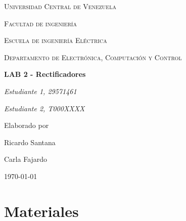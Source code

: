 \documentclass[letterpaper, 12pt]{report}
\begin{document}

\begin{titlepage}
	\centering
	{\scshape\Large Universidad Central de Venezuela \par}
    {\scshape\Large Facultad de ingenier\'ia \par}
    {\scshape\Large Escuela de ingenier\'ia El\'ectrica \par}
    {\scshape\Large Departamento de Electr\'onica, Computaci\'on y Control \par}
    \vspace{4cm}
	{\Large\bfseries LAB 2 - Rectificadores\par}
	\vspace{4cm}
	{\itshape Estudiante 1, 29571461 \par}
    {\itshape Estudiante 2, T000XXXX \par}
	\vfill
	Elaborado por\par
	Ricardo Santana\par
    Carla Fajardo
	\vfill
	{\large \today\par}
\end{titlepage}

\begin{abstract}
In this lab, the student will learn about the operation of a single-phase diode rectifier with a resistive load and their performance parameters. The student will verify the impact of a half-wave and a full-wave rectified sine wave on the power quality of the networks it is attached to, by studying its harmonic distortion and power factor. 
\end{abstract}

\section{Materiales}
\end{document}
